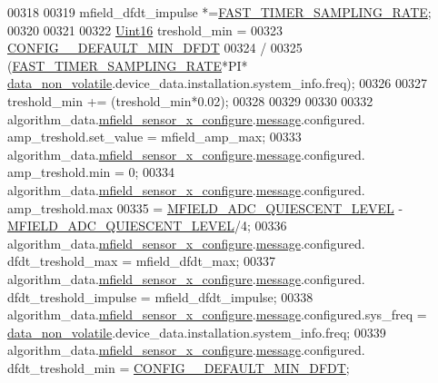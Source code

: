 \begin{DoxyCode}
{{{{{00318 
00319              mfield\_dfdt\_impulse  *=\hyperlink{a00021_a3a4dcb8af26a561d90607a41a3745806}{FAST\_TIMER\_SAMPLING\_RATE};
00320  
00321 
00322      \hyperlink{a00072_a59a9f6be4562c327cbfb4f7e8e18f08b}{Uint16} treshold\_min                  =
00323             \hyperlink{a00021_a0eae7c540b766617bb00f79cd63415a2}{CONFIG\_\_DEFAULT\_MIN\_DFDT}
00324             /
00325             (\hyperlink{a00021_a3a4dcb8af26a561d90607a41a3745806}{FAST\_TIMER\_SAMPLING\_RATE}*PI*
      \hyperlink{a00060_a76ac5f917f5308dcd83de0d7c94559fb}{data\_non\_volatile}.device\_data.installation.system\_info.freq);
00326 
00327             treshold\_min                 += (treshold\_min*0.02);
00328 
00329 
00330 
00332     algorithm\_data.\hyperlink{a00016_a1bfdf4869db9c4f125b763d2e27c6c08}{mfield\_sensor\_x\_configure}.\hyperlink{a00019_ae926905663cb8ca01f1bc2d670e428f5}{message}.configured.
      amp\_treshold.set\_value    = mfield\_amp\_max;
00333     algorithm\_data.\hyperlink{a00016_a1bfdf4869db9c4f125b763d2e27c6c08}{mfield\_sensor\_x\_configure}.\hyperlink{a00019_ae926905663cb8ca01f1bc2d670e428f5}{message}.configured.
      amp\_treshold.min          = 0;
00334     algorithm\_data.\hyperlink{a00016_a1bfdf4869db9c4f125b763d2e27c6c08}{mfield\_sensor\_x\_configure}.\hyperlink{a00019_ae926905663cb8ca01f1bc2d670e428f5}{message}.configured.
      amp\_treshold.max          
00335             = \hyperlink{a00019_a2310c2bd339d54b86e9fae262def2008}{MFIELD\_ADC\_QUIESCENT\_LEVEL} - 
      \hyperlink{a00019_a2310c2bd339d54b86e9fae262def2008}{MFIELD\_ADC\_QUIESCENT\_LEVEL}/4;
00336     algorithm\_data.\hyperlink{a00016_a1bfdf4869db9c4f125b763d2e27c6c08}{mfield\_sensor\_x\_configure}.\hyperlink{a00019_ae926905663cb8ca01f1bc2d670e428f5}{message}.configured.
      dfdt\_treshold\_max         = mfield\_dfdt\_max;
00337     algorithm\_data.\hyperlink{a00016_a1bfdf4869db9c4f125b763d2e27c6c08}{mfield\_sensor\_x\_configure}.\hyperlink{a00019_ae926905663cb8ca01f1bc2d670e428f5}{message}.configured.
      dfdt\_treshold\_impulse     = mfield\_dfdt\_impulse;
00338     algorithm\_data.\hyperlink{a00016_a1bfdf4869db9c4f125b763d2e27c6c08}{mfield\_sensor\_x\_configure}.\hyperlink{a00019_ae926905663cb8ca01f1bc2d670e428f5}{message}.configured.sys\_freq   
                     = \hyperlink{a00060_a76ac5f917f5308dcd83de0d7c94559fb}{data\_non\_volatile}.device\_data.installation.system\_info.freq;
00339     algorithm\_data.\hyperlink{a00016_a1bfdf4869db9c4f125b763d2e27c6c08}{mfield\_sensor\_x\_configure}.\hyperlink{a00019_ae926905663cb8ca01f1bc2d670e428f5}{message}.configured.
      dfdt\_treshold\_min         = \hyperlink{a00021_a0eae7c540b766617bb00f79cd63415a2}{CONFIG\_\_DEFAULT\_MIN\_DFDT};
}}}}}
\end{DoxyCode}
